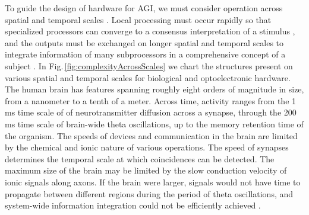 \documentclass[twocolumn]{article}
\begin{document}
To guide the design of hardware for AGI, we must consider operation across spatial and temporal scales \cite{beba2016}. Local processing must occur rapidly so that specialized processors can converge to a consensus interpretation of a stimulus \cite{bema2008}, and the outputs must be exchanged on longer spatial and temporal scales to integrate information of many subprocessors in a comprehensive concept of a subject \cite{ba1988,de2014}. In Fig.\,\ref{fig:complexityAcrossScales} we chart the structures present on various spatial and temporal scales for biological and optoelectronic hardware. The human brain has features spanning roughly eight orders of magnitude in size, from a nanometer to a tenth of a meter. Across time, activity ranges from the 1\,ms time scale of of neurotransmitter diffusion across a synapse, through the 200\,ms time scale of brain-wide theta oscillations, up to the memory retention time of the organism. The speeds of devices and communication in the brain are limited by the chemical and ionic nature of various operations. The speed of synapses determines the temporal scale at which coincidences can be detected. The maximum size of the brain may be limited by the slow conduction velocity of ionic signals along axons. If the brain were larger, signals would not have time to propagate between different regions during the period of theta oscillations, and system-wide information integration could not be efficiently achieved \cite{bu2006,sh2018_ICRC}. 
\end{document}
